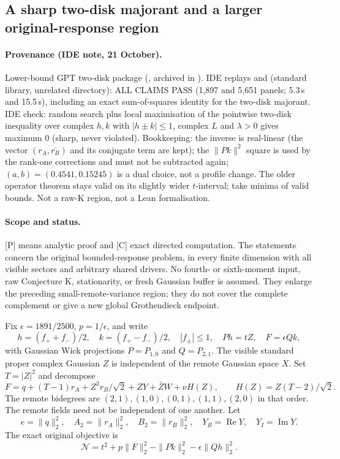 \subsection{A sharp two-disk majorant and a larger original-response region}
\label{sec:anisotropic-response-cap}
\paragraph{Provenance (IDE note, 21 October).} Lower-bound GPT two-disk package (, archived in
). IDE replays  and  (standard library, unrelated directory): ALL CLAIMS
PASS (1{,}897 and 5{,}651 panels; 5.3\,s and 15.5\,s), including an exact sum-of-squares identity for the two-disk majorant. IDE check: random search plus local
maximisation of the pointwise two-disk inequality over complex $h,k$ with $|h\pm k|\le1$, complex $L$ and $\lambda>0$ gives maximum $0$ (sharp, never violated).
Bookkeeping: the inverse is real-linear (the vector $(r_A,\overline{r_B})$ and its conjugate term are kept); the $\|Pk\|^2$ square is used by the rank-one corrections
and must not be subtracted again; $(a,b)=(0.4541,0.15245)$ is a dual choice, not a profile change. The older operator theorem stays valid on its slightly wider
$t$-interval; take minima of valid bounds. Not a raw-K region, not a Lean formalisation.


\paragraph{Scope and status.}
[P] means analytic proof and [C] exact directed computation.
The statements concern the original bounded-response problem, in every
finite dimension with all visible sectors and arbitrary shared drivers.
No fourth- or sixth-moment input, raw Conjecture K, stationarity, or fresh
Gaussian buffer is assumed. They enlarge the preceding small-remote-variance
region; they do not cover the complete complement or give a new global
Grothendieck endpoint.

Fix $\epsilon=1891/2500$, $p=1/\epsilon$, and write
\[
 h=(f_++f_-)/2,\quad k=(f_+-f_-)/2,\quad |f_\pm|\le1,
 \quad Ph=tZ,\quad F=\epsilon Qk,
\]
with Gaussian Wick projections $P=P_{1,0}$ and $Q=P_{2,1}$. The visible
standard proper complex Gaussian $Z$ is independent of the remote Gaussian
space $X$. Set $T=|Z|^2$ and decompose
\[
 F=q+(T-1)r_A+Z^2r_B/\sqrt2+ZY+\bar ZW+\nu H(Z),
 \qquad H(Z)=Z(T-2)/\sqrt2.
\]
The remote bidegrees are $(2,1),(1,0),(0,1),(1,1),(2,0)$ in that order.
The remote fields need not be independent of one another. Let
\[
 e=\|q\|_2^2,\quad A_2=\|r_A\|_2^2,\quad B_2=\|r_B\|_2^2,
 \quad Y_R=\operatorname{Re}Y,\quad Y_I=\operatorname{Im}Y.
\]
The exact original objective is
\[
 \mathcal N=t^2+p\|F\|_2^2-\|Pk\|_2^2-\epsilon\|Qh\|_2^2.
\]

